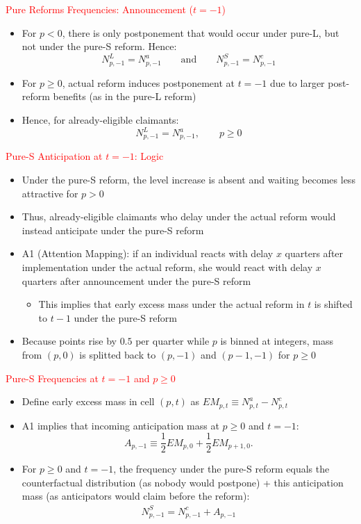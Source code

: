 \begin{frame}{\textcolor{red}{Pure Reforms Frequencies: Announcement ($t=-1$)}}
\begin{itemize}
    \item For $p<0$, there is only postponement that would  occur under pure-L, but not under the pure-S reform. Hence:
    \[
    N^L_{p,-1}=N^a_{p,-1}
    \qquad\text{and}\qquad
    N^S_{p,-1}=N^c_{p,-1}
    \]
    \item For $p\geq 0$, actual reform induces postponement at $t=-1$ due to larger post-reform benefits (as in the pure-L reform)
    \item Hence, for already-eligible claimants:
    \[
    N^L_{p,-1}=N^a_{p,-1}, \qquad p\geq 0
    \]
\end{itemize}
\end{frame}

\begin{frame}{\textcolor{red}{Pure-S Anticipation at $t=-1$: Logic}}
\begin{itemize}
    \item Under the pure-S reform, the level increase is absent and waiting becomes less attractive for $p>0$
    \item Thus, already-eligible claimants who delay under the actual reform would instead anticipate under the pure-S reform
    \item A1 (Attention Mapping): if an individual reacts with delay $x$ quarters after implementation under the actual reform, she would react with delay $x$ quarters after announcement under the pure-S reform
    \begin{itemize}
        \item This implies that early excess mass under the actual reform in $t$ is shifted to $t-1$ under the pure-S reform
    \end{itemize}
    \item Because points rise by $0.5$ per quarter while $p$ is binned at integers, mass from $(p,0)$ is splitted back to $(p,-1)$ and $(p-1,-1)$ for $p\geq 0$
\end{itemize}
\end{frame}

\begin{frame}{\textcolor{red}{Pure-S Frequencies at $t=-1$ and $p\geq 0$}}
    \begin{itemize}
        \item Define early excess mass in cell $(p,t)$ as $EM_{p,t}\equiv N^a_{p,t}-N^c_{p,t}$
        \item A1 implies that incoming anticipation mass at $p\geq 0$ and $t=-1$:
        \[
        A_{p,-1}\equiv \frac12 EM_{p,0}+\frac12 EM_{p+1,0}.
        \]
        \item For $p\geq 0$ and $t=-1$, the frequency under the pure-S reform equals the counterfactual distribution (as nobody would postpone) + this anticipation mass (as anticipators would claim before the reform):
        \begin{align*}
            N^S_{p,-1}=N^c_{p,-1}+A_{p,-1}
        \end{align*}
    \end{itemize}
\end{frame}

